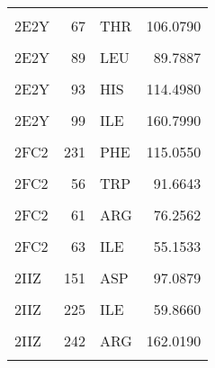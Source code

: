 \begin{table}
\begin{tabular}{lrlr}
			\addlinespace
			\cellcolor{gray!6}{2E2Y} & \cellcolor{gray!6}{64} & \cellcolor{gray!6}{ASP} & \cellcolor{gray!6}{101.7770}\\
			2E2Y & 67 & THR & 106.0790\\
			\cellcolor{gray!6}{2E2Y} & \cellcolor{gray!6}{68} & \cellcolor{gray!6}{ILE} & \cellcolor{gray!6}{97.7283}\\
			2E2Y & 89 & LEU & 89.7887\\
			\cellcolor{gray!6}{2E2Y} & \cellcolor{gray!6}{92} & \cellcolor{gray!6}{SER} & \cellcolor{gray!6}{115.2050}\\
			\addlinespace
			2E2Y & 93 & HIS & 114.4980\\
			\cellcolor{gray!6}{2E2Y} & \cellcolor{gray!6}{97} & \cellcolor{gray!6}{HIS} & \cellcolor{gray!6}{177.1860}\\
			2E2Y & 99 & ILE & 160.7990\\
			\cellcolor{gray!6}{2FC2} & \cellcolor{gray!6}{214} & \cellcolor{gray!6}{ILE} & \cellcolor{gray!6}{136.6930}\\
			2FC2 & 231 & PHE & 115.0550\\
			\addlinespace
			\cellcolor{gray!6}{2FC2} & \cellcolor{gray!6}{234} & \cellcolor{gray!6}{TRP} & \cellcolor{gray!6}{40.3488}\\
			2FC2 & 56 & TRP & 91.6643\\
			\cellcolor{gray!6}{2FC2} & \cellcolor{gray!6}{59} & \cellcolor{gray!6}{SER} & \cellcolor{gray!6}{146.0560}\\
			2FC2 & 61 & ARG & 76.2562\\
			\cellcolor{gray!6}{2FC2} & \cellcolor{gray!6}{62} & \cellcolor{gray!6}{CYS} & \cellcolor{gray!6}{112.5820}\\
			\addlinespace
			2FC2 & 63 & ILE & 55.1533\\
			\cellcolor{gray!6}{2FC2} & \cellcolor{gray!6}{65} & \cellcolor{gray!6}{ARG} & \cellcolor{gray!6}{70.9521}\\
			2IIZ & 151 & ASP & 97.0879\\
			\cellcolor{gray!6}{2IIZ} & \cellcolor{gray!6}{224} & \cellcolor{gray!6}{HIS} & \cellcolor{gray!6}{124.3380}\\
			2IIZ & 225 & ILE & 59.8660\\
			\addlinespace
			\cellcolor{gray!6}{2IIZ} & \cellcolor{gray!6}{228} & \cellcolor{gray!6}{VAL} & \cellcolor{gray!6}{165.2710}\\
			2IIZ & 242 & ARG & 162.0190\\
			\cellcolor{gray!6}{2IIZ} & \cellcolor{gray!6}{255} & \cellcolor{gray!6}{LEU} & \cellcolor{gray!6}{168.3090}\\

\end{tabular}
\end{table}
